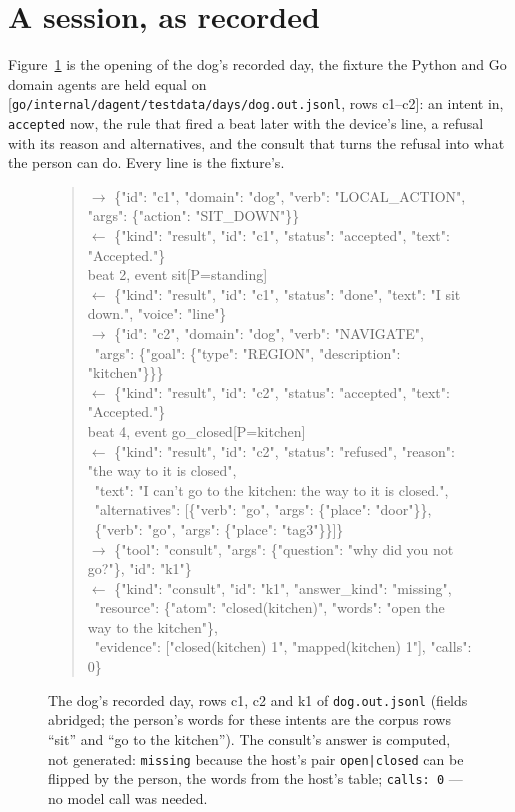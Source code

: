 \documentclass[11pt]{article}
\newcommand{\src}[1]{{\footnotesize\textsf{[#1]}}}
\begin{document}
\section{A session, as recorded}\label{sec:session}

Figure~\ref{fig:session} is the opening of the dog's recorded day, the fixture the Python
and Go domain agents are held equal on \src{\texttt{go/internal/dagent/testdata/days/dog.out.jsonl},
rows c1--c2}: an intent in, \texttt{accepted} now, the rule that fired a beat later with the
device's line, a refusal with its reason and alternatives, and the consult that turns the
refusal into what the person can do. Every line is the fixture's.

\begin{figure}[t]
\begin{quote}\footnotesize\ttfamily\raggedright
$\to$ \{"id": "c1", "domain": "dog", "verb": "LOCAL\_ACTION", "args": \{"action": "SIT\_DOWN"\}\}\\
$\leftarrow$ \{"kind": "result", "id": "c1", "status": "accepted", "text": "Accepted."\}\\
\quad beat 2, event sit[P=standing]\\
$\leftarrow$ \{"kind": "result", "id": "c1", "status": "done", "text": "I sit down.", "voice": "line"\}\\[1ex]
$\to$ \{"id": "c2", "domain": "dog", "verb": "NAVIGATE",\\
\quad\ "args": \{"goal": \{"type": "REGION", "description": "kitchen"\}\}\}\\
$\leftarrow$ \{"kind": "result", "id": "c2", "status": "accepted", "text": "Accepted."\}\\
\quad beat 4, event go\_closed[P=kitchen]\\
$\leftarrow$ \{"kind": "result", "id": "c2", "status": "refused", "reason": "the way to it is closed",\\
\quad\ "text": "I can't go to the kitchen: the way to it is closed.",\\
\quad\ "alternatives": [\{"verb": "go", "args": \{"place": "door"\}\},\\
\quad\quad\quad\quad\quad\quad\quad\quad\quad\ \{"verb": "go", "args": \{"place": "tag3"\}\}]\}\\[1ex]
$\to$ \{"tool": "consult", "args": \{"question": "why did you not go?"\}, "id": "k1"\}\\
$\leftarrow$ \{"kind": "consult", "id": "k1", "answer\_kind": "missing",\\
\quad\ "resource": \{"atom": "closed(kitchen)", "words": "open the way to the kitchen"\},\\
\quad\ "evidence": ["closed(kitchen) 1", "mapped(kitchen) 1"], "calls": 0\}
\end{quote}
\caption{The dog's recorded day, rows c1, c2 and k1 of \texttt{dog.out.jsonl} (fields
abridged; the person's words for these intents are the corpus rows ``sit'' and ``go to the
kitchen''). The consult's answer is computed, not generated: \texttt{missing} because the
host's pair \texttt{open|closed} can be flipped by the person, the words from the host's
table; \texttt{calls: 0} --- no model call was needed.}
\label{fig:session}
\end{figure}
\end{document}
